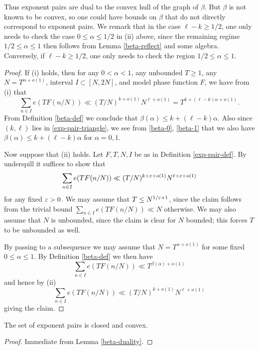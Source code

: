 
Thus exponent pairs are dual to the convex hull of the graph of $\beta$.  But $\beta$ is not known to be convex, so one could have bounds on $\beta$ that do not directly correspond to exponent pairs.  We remark that in the case $\ell - k \geq 1/2$, one only needs to check the case $0 \leq \alpha \leq 1/2$ in (ii) above, since the remaining regime $1/2 \leq \alpha \leq 1$ then follows from Lemma \ref{beta-reflect} and some algebra.  Conversely, if $\ell - k \geq 1/2$, one only needs to check the region $1/2 \leq \alpha \leq 1$.

\begin{proof}  If (i) holds, then for any $0 < \alpha < 1$, any unbounded $T \geq 1$, any $N = T^{\alpha+o(1)}$, interval $I \subset [N,2N]$, and model phase function $F$, we have from (i) that
$$ \sum_{n \in I} e(T F(n/N)) \ll (T/N)^{k+o(1)} N^{\ell+o(1)} = T^{k + (\ell-k)\alpha + o(1)}.$$
From Definition \ref{beta-def} we conclude that $\beta(\alpha) \leq k + (\ell-k) \alpha$.  Also since $(k,\ell)$ lies in \eqref{exp-pair-triangle}, we see from \eqref{beta-0}, \eqref{beta-1} that we also have $\beta(\alpha) \leq k + (\ell-k) \alpha$ for $\alpha=0,1$.

Now suppose that (ii) holds.  Let $F, T, N, I$ be as in Definition \ref{exp-pair-def}.  By underspill it suffices to show that
$$ \sum_{n \in I} e(T F(n/N)) \ll (T/N)^{k+\varepsilon+o(1)} N^{\ell+\varepsilon+o(1)}$$
for any fixed $\varepsilon>0$.  We may assume that $T \leq N^{1/\varepsilon+1}$, since the claim follows from the trivial bound $\sum_{n \in I} e(T F(n/N)) \ll N$ otherwise.  We may also assume that $N$ is unbounded, since the claim is clear for $N$ bounded; this forces $T$ to be unbounded as well.

By passing to a subsequence we may assume that $N = T^{\alpha+o(1)}$ for some fixed $0 \leq \alpha \leq 1$.  By Definition \ref{beta-def} we then have
$$ \sum_{n \in I} e(T F(n/N)) \ll T^{\beta(\alpha)+o(1)}$$
and hence by (ii)
$$ \sum_{n \in I} e(T F(n/N)) \ll (T/N)^{k+o(1)} N^{\ell+o(1)}$$
giving the claim.
\end{proof}


\begin{corollary}\label{exp-pair-closed} The set of exponent pairs is closed and convex.
\end{corollary}

\begin{proof} Immediate from Lemma \ref{beta-duality}.
\end{proof}

